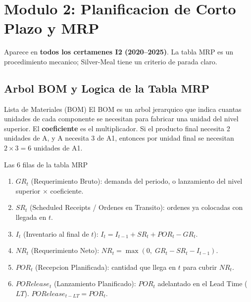 \documentclass[11pt, a4paper]{article}
\begin{document}
\section[Modulo 2: MRP y Loteo]{Modulo 2: Planificacion de Corto Plazo y MRP}

Aparece en \textbf{todos los certamenes I2 (2020--2025)}.
La tabla MRP es un procedimiento mecanico; Silver-Meal tiene un criterio de parada claro.

\subsection{Arbol BOM y Logica de la Tabla MRP}

\begin{definicion}{Lista de Materiales (BOM)}
  El BOM es un arbol jerarquico que indica cuantas unidades de cada componente
  se necesitan para fabricar una unidad del nivel superior. El \textbf{coeficiente}
  es el multiplicador. Si el producto final necesita 2 unidades de A, y A necesita
  3 de A1, entonces por unidad final se necesitan $2 \times 3 = 6$ unidades de A1.
\end{definicion}

\begin{formulas}{Las 6 filas de la tabla MRP}
  \begin{enumerate}[leftmargin=1.5em, itemsep=2pt]
    \item $GR_t$ (Requerimiento Bruto): demanda del periodo, o lanzamiento del nivel superior $\times$ coeficiente.
    \item $SR_t$ (Scheduled Receipts / Ordenes en Transito): ordenes ya colocadas con llegada en $t$.
    \item $I_t$ (Inventario al final de $t$): $I_t = I_{t-1} + SR_t + POR_t - GR_t$.
    \item $NR_t$ (Requerimiento Neto): $NR_t = \max(0,\; GR_t - SR_t - I_{t-1})$.
    \item $POR_t$ (Recepcion Planificada): cantidad que llega en $t$ para cubrir $NR_t$.
    \item $PORelease_t$ (Lanzamiento Planificado): $POR_t$ adelantado en el Lead Time ($LT$).
          $PORelease_{t-LT} = POR_t$.
  \end{enumerate}
\end{formulas}
\end{document}
